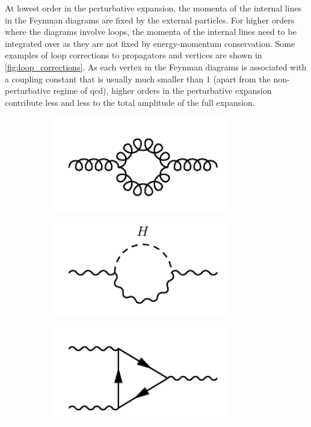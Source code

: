 At lowest order in the perturbative expansion, the momenta of the internal lines in the Feynman diagrams are fixed by the external particles. For higher orders where the diagrams involve loops, the momenta of the internal lines need to be integrated over as they are not fixed by energy-momentum conservation. Some examples of loop corrections to propagators and vertices are shown in \cref{fig:loop_corrections}. As each vertex in the Feynman diagrams is associated with a coupling constant that is usually much smaller than 1 (apart from the non-perturbative regime of \gls{qcd}), higher orders in the perturbative expansion contribute less and less to the total amplitude of the full expansion.

\begin{figure}
	\centering
	\begin{subfigure}[b]{0.33\linewidth}
		\centering\includegraphics[width=0.85\textwidth]{gluon_loop}
		\caption{\label{fig:gluon_loop}}
	\end{subfigure}%
	\begin{subfigure}[b]{0.33\linewidth}
		\centering\includegraphics[width=0.85\textwidth]{wz_propagator}
		\caption{\label{fig:wz_propagator}}
	\end{subfigure}	
	\begin{subfigure}[b]{0.33\linewidth}
		\centering\includegraphics[width=0.85\textwidth]{cubic_vertex}

\end{subfigure}
\end{figure}
